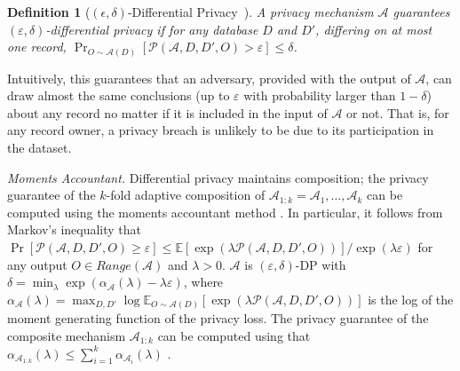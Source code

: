 \documentclass[accepted]{uai2021} %
\newcommand{\descr}[1]{\vspace{0.1cm}\noindent\textit{#1}}
\newtheorem{definition}{Definition}
\begin{document}
\begin{definition}[$(\epsilon,\delta)$-Differential Privacy~\citep{Dwork2014book}] 
A privacy mechanism $\mathcal{A}$ guarantees $(\varepsilon, \delta)$-differential privacy if for any database $D$ and $D'$, differing on at most one record, $\Pr_{O \sim \mathcal{A}(D)}[\mathcal{P}(\mathcal{A},D,D',O) > \varepsilon] \leq \delta$. 

\label{def:DP}
\end{definition}

Intuitively, this guarantees that an adversary, provided with the output of $\mathcal{A}$, can draw almost the same conclusions (up to $\varepsilon$ with probability larger than $1 - \delta$) about any record no matter if it is included in the input of $\mathcal{A}$ or not. That is, for any record owner, a privacy breach is unlikely to be due to its participation in the dataset. 


\descr{Moments Accountant.} Differential privacy maintains composition; the privacy guarantee of the  $k$-fold adaptive composition  of $\mathcal{A}_{1:k} = \mathcal{A}_1, \ldots, \mathcal{A}_k$ can be computed using the moments accountant method \cite{Abadi}. In particular, it follows from Markov's inequality that $\Pr[\mathcal{P}(\mathcal{A},D,D',O) \geq \varepsilon] \leq \mathbb{E}[\exp(\lambda \mathcal{P}(\mathcal{A},D,D',O))]/\exp(\lambda\varepsilon)$ for any output $O \in \mathit{Range}(\mathcal{A})$ and $\lambda > 0$. 
$\mathcal{A}$ is $(\varepsilon, \delta)$-DP %
with $\delta = \min_{\lambda} \exp(\alpha_{\mathcal{A}}(\lambda) - \lambda \varepsilon)$, where $\alpha_{\mathcal{A}}(\lambda) = \max_{D,D'} \log\mathbb{E}_{O\sim \mathcal{A}(D)}[\exp(\lambda \mathcal{P}(\mathcal{A},D,D',O))]$ is the log of the moment generating function of the privacy loss. The privacy guarantee of the composite mechanism $\mathcal{A}_{1:k}$ can be computed using that $\alpha_{\mathcal{A}_{1:k}}(\lambda) \leq \sum_{i=1}^k \alpha_{\mathcal{A}_{i}}(\lambda)$ \cite{Abadi}. \smallskip 
\end{document}
